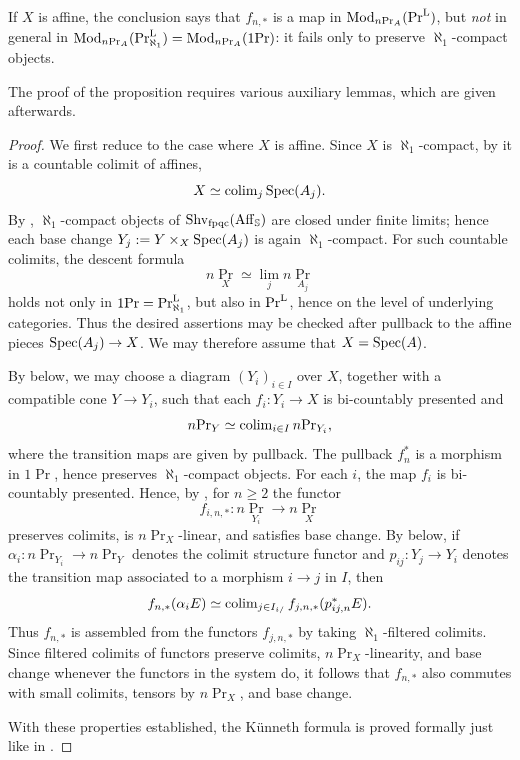 \documentclass[11pt]{book}
\begin{document}
	\begin{remark}
		If $X$ is affine, the conclusion says that $f_{n,*}$ is a map in ${\textup{Mod}}_{n\textup{Pr}_A}(\textup{Pr}^{\textup{L}})$, but \emph{not} in general in ${\textup{Mod}}_{n\textup{Pr}_A}(\textup{Pr}^{\textup{L}}_{\aleph_1}) = {\textup{Mod}}_{n\textup{Pr}_A}(1\textup{Pr})$: it fails only to preserve $\aleph_1$-compact objects.
	\end{remark}

	The proof of the proposition requires various auxiliary lemmas, which are given afterwards.

	\begin{proof}
		We first reduce to the case where $X$ is affine. Since $X$ is $\aleph_1$-compact, by  it is a countable colimit of affines,
		\[
			X \simeq \operatorname{colim}_j \operatorname{Spec}(A_j).
		\]
		By ,
		$\aleph_1$-compact objects of $\operatorname{Shv}_{\operatorname{fpqc}}(\operatorname{Aff}_{\operatorname{\mathbb S}})$ are closed under
		finite limits; hence each base change
		$Y_j := Y \times_X \operatorname{Spec}(A_j)$ is again $\aleph_1$-compact.
		For such countable colimits, the descent formula
		\[
			n\Pr_X \simeq \lim_j n\Pr_{A_j}
		\]
		holds not only in $1\textup{Pr} = \textup{Pr}^{\textup{L}}_{\aleph_1}$, but also in $\textup{Pr}^{\textup{L}}$, hence on
		the level of underlying categories. Thus the desired
		assertions may be checked after pullback to the affine pieces
		$\operatorname{Spec}(A_j) \to X$. We may therefore assume that $X = \operatorname{Spec}(A)$.

		By  below, we may
		choose a diagram $(Y_i)_{i \in I}$ over $X$, together with a compatible
		cone $Y \to Y_i$, such that each $f_i\colon Y_i \to X$ is
		bi-countably presented and
		\[
			n\textup{Pr}_Y \simeq \operatorname{colim}_{i \in I} n\textup{Pr}_{Y_i},
		\]
		where the transition maps are given by pullback. The pullback
		$f_n^*$ is a morphism in $1\Pr$, hence preserves
		$\aleph_1$-compact objects. For each $i$, the map $f_i$ is
		bi-countably presented. Hence, by
		, for $n \geq 2$ the functor
		\[
			f_{i,n,*}\colon n\Pr_{Y_i} \to n\Pr_X
		\]
		preserves colimits, is $n\Pr_X$-linear, and satisfies base change. By
		 below, if
		$\alpha_i\colon n\Pr_{Y_i} \to n\Pr_Y$ denotes the colimit structure
		functor and $p_{ij}\colon Y_j \to Y_i$ denotes the transition map
		associated to a morphism $i \to j$ in $I$, then
		\[
			f_{n,*}(\alpha_i E)
			\simeq
			\operatorname{colim}_{j \in I_{i/}} f_{j,n,*}(p_{ij,n}^*E).
		\]
		Thus $f_{n,*}$ is assembled from the functors $f_{j,n,*}$ by taking
		$\aleph_1$-filtered colimits. Since filtered colimits of functors
		preserve colimits, $n\Pr_X$-linearity, and base change whenever the
		functors in the system do, it follows that $f_{n,*}$ also commutes with
		small colimits, tensors by $n\Pr_X$, and base change.

		With these properties established, the Künneth formula is proved formally just like in .
	\end{proof}
\end{document}
